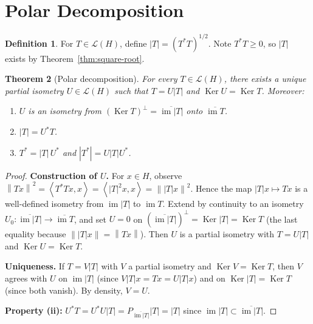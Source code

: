 \documentclass[a4paper,12pt]{book}
\DeclareMathOperator{\im}{im}
\DeclareMathOperator{\Ker}{Ker}
\newcommand{\norm}[1]{\left\| #1 \right\|}
\newcommand{\abs}[1]{\left| #1 \right|}
\newcommand{\inner}[2]{\left\langle #1, #2 \right\rangle}
\theoremstyle{definition}
\newtheorem{definition}{Definition}[chapter]
\theoremstyle{plain}
\newtheorem{theorem}[definition]{Theorem}
\theoremstyle{remark}
\begin{document}

\section{Polar Decomposition}\label{sec:polar-decomp}


\begin{definition}\label{def:abs-value-op}
For $T \in \mathcal{L}(H)$, define $\abs{T} = (T^*T)^{1/2}$. Note $T^*T \ge 0$,
so $\abs{T}$ exists by Theorem~\ref{thm:square-root}.
\end{definition}

\begin{theorem}[Polar decomposition]\label{thm:polar-decomp}
For every $T \in \mathcal{L}(H)$, there exists a unique partial isometry
$U \in \mathcal{L}(H)$ such that $T = U\abs{T}$ and
$\Ker U = \Ker T$. Moreover:
\begin{enumerate}[label=(\roman*)]
  \item $U$ is an isometry from $(\Ker T)^\perp = \overline{\im \abs{T}}$ onto
        $\overline{\im T}$.
  \item $\abs{T} = U^* T$.
  \item $T^* = \abs{T}\, U^*$ and $\abs{T^*} = U\abs{T}U^*$.
\end{enumerate}
\end{theorem}

\begin{proof}
\textbf{Construction of $U$.} For $x \in H$, observe
$\norm{Tx}^2 = \inner{T^*Tx}{x} = \inner{\abs{T}^2 x}{x} = \norm{\abs{T}x}^2$.
Hence the map $\abs{T}x \mapsto Tx$ is a well-defined isometry from
$\im\abs{T}$ to $\im T$. Extend by continuity to an isometry
$U_0 \colon \overline{\im\abs{T}} \to \overline{\im T}$, and set $U = 0$
on $(\overline{\im\abs{T}})^\perp = \Ker\abs{T} = \Ker T$ (the last equality
because $\norm{\abs{T}x} = \norm{Tx}$). Then $U$ is a partial isometry with
$T = U\abs{T}$ and $\Ker U = \Ker T$.

\textbf{Uniqueness.} If $T = V\abs{T}$ with $V$ a partial isometry and
$\Ker V = \Ker T$, then $V$ agrees with $U$ on $\im\abs{T}$ (since
$V\abs{T}x = Tx = U\abs{T}x$) and on $\Ker\abs{T} = \Ker T$ (since both
vanish). By density, $V = U$.

\textbf{Property (ii):} $U^*T = U^*U\abs{T} = P_{\overline{\im\abs{T}}}\abs{T} = \abs{T}$
since $\im\abs{T} \subset \overline{\im\abs{T}}$.
\end{proof}
\end{document}
